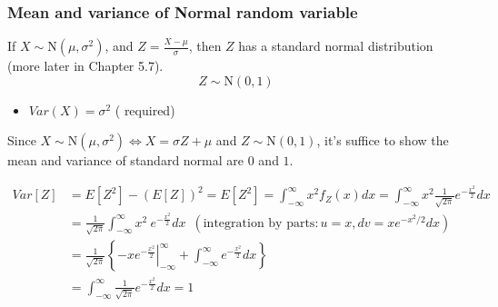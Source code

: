 \documentclass[slidestop,compress,mathserif]{beamer}
\begin{document}
\begin{frame}\frametitle{Mean and variance of Normal random variable}
If $X \sim \text{N}(\mu, \sigma^2)$, and $Z = \frac{X - \mu}{\sigma}$, then $Z$ has a standard normal distribution (more later in Chapter 5.7).
\[ Z \sim \text{N}(0, 1) \]

\begin{itemize}
\item $Var(X) = \sigma^2$ ({\color{red} required})
\end{itemize}


\hspace{0.5cm}
Since $X \sim \text{N}(\mu, \sigma^2) \Longleftrightarrow X = \sigma Z + \mu$ and $Z \sim \text{N}(0, 1)$,
it's suffice to show the mean and variance of standard normal are $0$ and $1$.

{\footnotesize{
\begin{align*}
Var[Z] & = E[Z^2]  - (E[Z])^2 = E[Z^2] = \int_{-\infty}^{\infty} x^2 f_Z(x) dx = \int_{-\infty}^{\infty} x^2 \frac{1}{\sqrt{2\pi}} e^{-\frac{x^2}{2}}dx\\
& = \frac{1}{\sqrt{2\pi}}\int_{-\infty}^{\infty} x^2~e^{-\frac{x^2}{2}}dx \,\,\, (\text{integration by parts}: u = x, dv = xe^{-x^2/2}dx) \\
& = \frac{1}{\sqrt{2\pi}}\left\{  - \left. xe^{-\frac{x^2}{2}}\right|_{-\infty}^{\infty} + \int_{-\infty}^{\infty} e^{-\frac{x^2}{2}}dx\right\}\\
& = \int_{-\infty}^{\infty} \frac{1}{\sqrt{2\pi}}e^{-\frac{x^2}{2}}dx =1
\end{align*}
}}

\end{frame}


\end{document}

